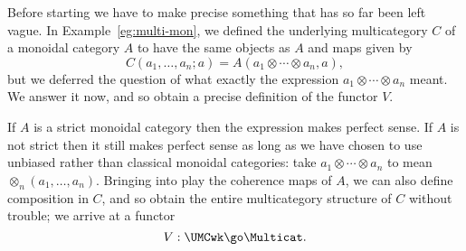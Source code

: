 Before starting we have to make precise something that has so far been left
vague. In Example~\ref{eg:multi-mon}, we defined the underlying
multicategory $C$ of a monoidal category $A$ to have the same objects as
$A$ and maps given by
\[
C(a_1, \ldots, a_n ; a) = A(a_1 \otimes\cdots\otimes a_n, a),
\]
but we deferred the question of what exactly the expression $a_1
\otimes\cdots\otimes a_n$ meant.  We answer it now, and so obtain a precise
definition of the functor $V$.

If $A$ is a strict monoidal category then the expression makes perfect
sense.  If $A$ is not strict then it still makes perfect sense as long as
we have chosen to use unbiased rather%
%
%
than classical monoidal categories:
take $a_1 \otimes\cdots\otimes a_n$ to mean $\otimes_n(a_1, \ldots, a_n)$.
Bringing into play the coherence maps of $A$, we can also define
composition in $C$, and so obtain the entire multicategory structure of $C$
without trouble; we arrive at a functor
\[
V: \UMCwk \go \Multicat.
\]



